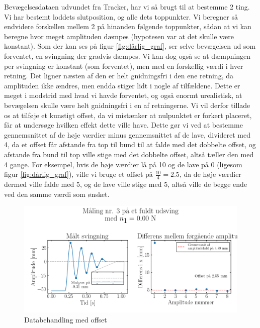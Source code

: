 Bevægelsesdataen udvundet fra Tracker, har vi så brugt til at bestemme 2 ting. Vi har bestemt loddets slutposition, og alle dets toppunkter. 
Vi beregner så endvidere forskellen mellem 2 på hinanden følgende toppunkter, sådan at vi kan beregne hvor meget amplituden dæmpes (hypotesen var at det skulle være konstant).
Som der kan ses på figur \ref{fig:dårlig_graf}, ser selve bevægelsen ud som forventet, en svingning der gradvis dæmpes. 
Vi kan dog også se at dæmpningen per svingning er konstant (som forventet), men med en forskellig værdi i hver retning. 
Det ligner næsten af den er helt gnidningsfri i den ene retning, da amplituden ikke ændres, men endda stiger lidt i nogle af tilfældene.
Dette er meget i modstrid med hvad vi havde forventet, og også enormt urealistisk, at bevægelsen skulle være helt gnidningsfri i en af retningerne. 
Vi vil derfor tillade os at tilføje et kunstigt offset, da vi mistænker at nulpunktet er forkert placeret, får at undersøge hvilken effekt dette ville have. 
Dette gør vi ved at bestemme gennemsnittet af de høje værdier minus gennemsnittet af de lave, divideret med 4, da et offset får afstande fra top til bund til at falde med det dobbelte offset, 
og afstande fra bund til top ville stige med det dobbelte offset, altså tæller den med 4 gange. For eksempel, hvis de høje værdier lå på 10 og de lave på 0 (ligesom figur \ref{fig:dårlig_graf}),
ville vi bruge et offset på $\frac{10}{4}=2.5$, da de høje værdier dermed ville falde med 5, og de lave ville stige med 5, altså ville de begge ende ved den samme værdi som ønsket.
\begin{figure}[htbp]
    \centering
    \includegraphics[width=0.8\linewidth,origin=c]{figures/n0.00-maks3-offset.png}
    \caption{Databehandling med offset}
    \label{fig:offset_graf}
\end{figure}

